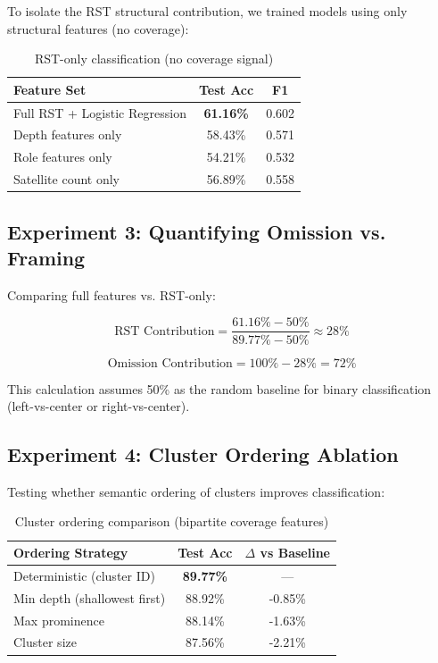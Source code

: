 \documentclass[11pt]{article}
\begin{document}
To isolate the RST structural contribution, we trained models using only structural features (no coverage):

\begin{table}[h]
\centering
\begin{tabular}{lcc}
\toprule
\textbf{Feature Set} & \textbf{Test Acc} & \textbf{F1} \\
\midrule
Full RST + Logistic Regression & \textbf{61.16\%} & 0.602 \\
Depth features only & 58.43\% & 0.571 \\
Role features only & 54.21\% & 0.532 \\
Satellite count only & 56.89\% & 0.558 \\
\bottomrule
\end{tabular}
\caption{RST-only classification (no coverage signal)}
\label{tab:rst-only}
\end{table}

\subsection{Experiment 3: Quantifying Omission vs. Framing}

Comparing full features vs. RST-only:

\begin{equation}
\text{RST Contribution} = \frac{61.16\% - 50\%}{89.77\% - 50\%} \approx 28\%
\end{equation}

\begin{equation}
\text{Omission Contribution} = 100\% - 28\% = 72\%
\end{equation}

This calculation assumes 50\% as the random baseline for binary classification (left-vs-center or right-vs-center).

\subsection{Experiment 4: Cluster Ordering Ablation}

Testing whether semantic ordering of clusters improves classification:

\begin{table}[h]
\centering
\begin{tabular}{lcc}
\toprule
\textbf{Ordering Strategy} & \textbf{Test Acc} & \textbf{$\Delta$ vs Baseline} \\
\midrule
Deterministic (cluster ID) & \textbf{89.77\%} & --- \\
Min depth (shallowest first) & 88.92\% & -0.85\% \\
Max prominence & 88.14\% & -1.63\% \\
Cluster size & 87.56\% & -2.21\% \\
\bottomrule
\end{tabular}
\caption{Cluster ordering comparison (bipartite coverage features)}
\label{tab:ordering}
\end{table}
\end{document}
